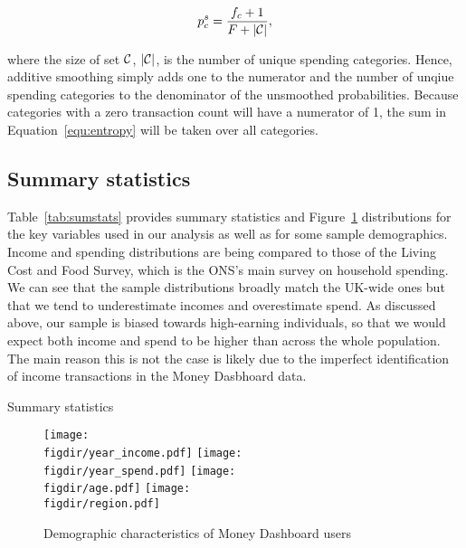 \begin{equation}
    \label{equ:prob_s}
    p_c^{s} = \frac{f_c + 1}{F + |\mathcal{C}|},
\end{equation}

\noindent where the size of set $\mathcal{C}$, $|\mathcal{C}|$, is the number of unique
spending categories. Hence, additive smoothing simply adds one to the numerator
and the number of unqiue spending categories to the denominator of the
unsmoothed probabilities. Because categories with a zero transaction count will
have a numerator of 1, the sum in Equation~\ref{equ:entropy} will be taken over
all categories.


\subsection{Summary statistics}%
\label{par:summary_statistics}

Table~\ref{tab:sumstats} provides summary statistics and
Figure~\ref{fig:sample_desc} distributions for the key variables used in our
analysis as well as for some sample demographics. Income and spending
distributions are being compared to those of the Living Cost and Food
Survey, which is the ONS's main survey on household spending. We can see that
the sample distributions broadly match the UK-wide ones but that we tend to
underestimate incomes and overestimate spend. As discussed above, our sample is
biased towards high-earning individuals, so that we would expect both income
and spend to be higher than across the whole population. The main reason this
is not the case is likely due to the imperfect identification of income
transactions in the Money Dasbhoard data.

\begin{table}[ht]
\centering\scriptsize
\caption{Summary statistics}
\label{tab:sumstats}

\end{table}

\begin{figure}[ht]
    \centering
    \caption{Demographic characteristics of Money Dashboard users}
    \label{fig:sample_desc}
    \texttt{[image: \\figdir/year\_income.pdf]}
    \texttt{[image: \\figdir/year\_spend.pdf]}
    \texttt{[image: \\figdir/age.pdf]}
    \texttt{[image: \\figdir/region.pdf]}
\end{figure}


